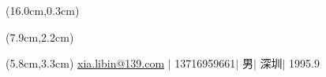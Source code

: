 \documentclass[a4paper]{resume-openfont}
\begin{document}

\begin{textblock*}{\textwidth}(16.0cm,0.3cm) %
\end{textblock*}

\newcommand{\yourName}{夏立斌}
\newcommand{\yourEmail}{xia.libin@139.com}
\newcommand{\yourPhone}{13716959661}
\newcommand{\yourMale}{男}
\newcommand{\yourBase}{深圳}
\newcommand{\yourBirth}{1995.9}




\begin{textblock*}{\textwidth}(7.9cm,2.2cm)
    \Huge \scshape \latoRegular{\yourName} 
\end{textblock*}
\begin{textblock*}{\textwidth}(5.8cm,3.3cm)
	\small \href{mailto:\yourEmail}{\yourEmail}  $|$  \yourPhone   $|$  \yourMale  $|$  \yourBase  $|$  \yourBirth
\end{textblock*}
\end{document}
